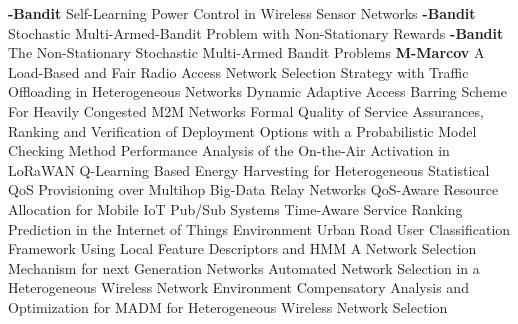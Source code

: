 \textbf{-Bandit} \newline  \cite{chincoli_self-learning_2018} Self-{{Learning Power Control}} in {{Wireless Sensor Networks}} \newline 
\textbf{-Bandit} \newline  \cite{gur_stochastic_2014} Stochastic {{Multi}}-{{Armed}}-{{Bandit Problem}} with {{Non}}-Stationary {{Rewards}} \newline 
\textbf{-Bandit} \newline  \cite{allesiardo_nonstationary_2017} The Non-Stationary Stochastic Multi-Armed Bandit Problems \newline 
\textbf{M-Marcov} \newline  \cite{montoya_load-based_2018} A Load-Based and Fair Radio Access Network Selection Strategy with Traffic Offloading in Heterogeneous Networks \newline 
 \cite{bouzouita_dynamic_2016} Dynamic {{Adaptive Access Barring Scheme For Heavily Congested M2M Networks}} \newline 
 \cite{kochovski_formal_2019} Formal {{Quality}} of {{Service}} Assurances, Ranking and Verification of  Deployment Options with a Probabilistic Model Checking Method \newline 
 \cite{toussaint_performance_2016} Performance Analysis of the On-the-Air Activation in {{LoRaWAN}} \newline 
 \cite{zhang_q-learning_2019} Q-{{Learning Based Energy Harvesting}} for {{Heterogeneous Statistical QoS Provisioning}} over {{Multihop Big}}-{{Data Relay Networks}} \newline 
 \cite{georgakopoulos_qos-aware_2018} {{QoS}}-{{Aware Resource Allocation}} for {{Mobile IoT Pub}}/{{Sub Systems}} \newline 
 \cite{yuze_huang_time-aware_2017} Time-{{Aware Service Ranking Prediction}} in the {{Internet}} of {{Things Environment}} \newline 
 \cite{takahashi_urban_2012} Urban Road User Classification Framework Using Local Feature Descriptors and {{HMM}} \newline 
 \cite{qingyang_song_network_2005} A Network Selection Mechanism for next Generation Networks \newline 
 \cite{bari_automated_2007} Automated Network Selection in a Heterogeneous Wireless Network Environment \newline 
 \cite{zhou_compensatory_2016} Compensatory {{Analysis}} and {{Optimization}} for {{MADM}} for {{Heterogeneous Wireless Network Selection}} \newline 
